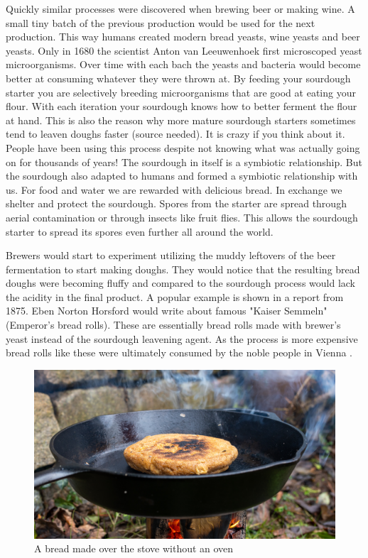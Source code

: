 Quickly similar processes were discovered when brewing beer
or making wine. A small tiny batch of the previous production
would be used for the next production. This way humans created
modern bread yeasts, wine yeasts and beer yeasts. Only in 1680
the scientist Anton van Leeuwenhoek first microscoped yeast
microorganisms. Over time with each bach the yeasts and bacteria
would become better at consuming whatever they were thrown at.
By feeding your sourdough starter you are selectively breeding
microorganisms that are good at eating your flour. With
each iteration your sourdough knows how to better ferment the flour
at hand. This is also the reason why more mature sourdough starters sometimes
tend to leaven doughs faster (source needed). It is crazy if you
think about it. People have been using this process despite not
knowing what was actually going on for thousands of years! The
sourdough in itself is a symbiotic relationship. But the sourdough
also adapted to humans and formed a symbiotic relationship with us.
For food and water we are rewarded with delicious bread. In exchange
we shelter and protect the sourdough. Spores from the starter
are spread through aerial contamination or through insects like fruit flies.
This allows the sourdough starter to spread its spores even
further all around the world. 

Brewers would start to experiment utilizing the muddy leftovers
of the beer fermentation to start making doughs. They would notice
that the resulting bread doughs were becoming fluffy and compared
to the sourdough process would lack the acidity in the final product.
A popular example is shown in a report from 1875. Eben Norton Horsford
would write about famous "Kaiser Semmeln" (Emperor's bread rolls).
These are essentially bread rolls made with brewer's yeast instead
of the sourdough leavening agent. As the process is more expensive
bread rolls like these were ultimately consumed by the noble people
in Vienna \cite{vienna+breadrolls}.

\begin{figure}[h]
  \includegraphics[width=\textwidth]{sourdough-stove}
  \caption{A bread made over the stove without an oven}
  \label{sourdough-stove}
\end{figure}

